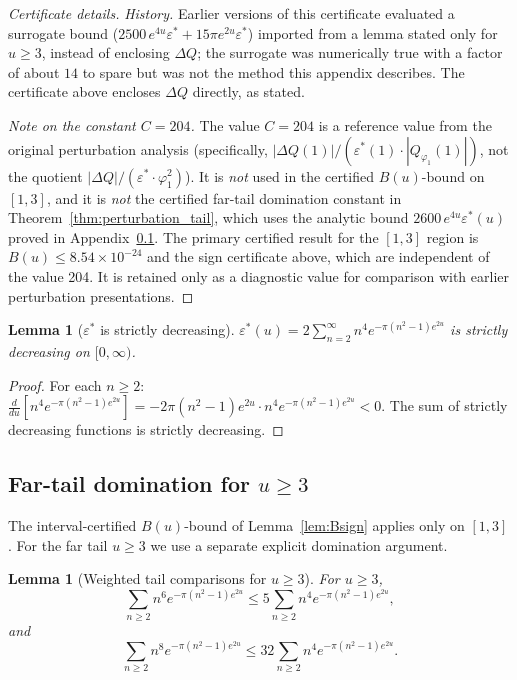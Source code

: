 \documentclass[11pt]{article}
\newtheorem{lemma}[theorem]{Lemma}
\theoremstyle{definition}
\theoremstyle{remark}
\begin{document}
\begin{proof}[Certificate details]
\noindent\emph{History.}
Earlier versions of this certificate evaluated a surrogate bound
($2500\,e^{4u}\varepsilon^* + 15\pi e^{2u}\varepsilon^*$) imported from a
lemma stated only for $u \geq 3$, instead of enclosing $\Delta Q$;
the surrogate was numerically true with a factor of about $14$ to spare
but was not the method this appendix describes.
The certificate above encloses $\Delta Q$ directly, as stated.

\noindent\emph{Note on the constant $C=204$.}
The value $C=204$ is a reference value from the original perturbation analysis
(specifically, $|\Delta Q(1)|/(\varepsilon^*(1)\cdot|Q_{\varphi_1}(1)|)$,
not the quotient $|\Delta Q|/(\varepsilon^*\cdot\varphi_1^2)$).
It is \emph{not} used in the certified $B(u)$-bound on $[1,3]$,
and it is \emph{not} the certified far-tail domination constant in
Theorem~\ref{thm:perturbation_tail}, which uses the analytic bound
$2600\,e^{4u}\varepsilon^*(u)$ proved in Appendix~\ref{sec:appE7}.
The primary certified result for the $[1,3]$ region is $B(u) \leq 8.54\times 10^{-24}$
and the sign certificate above, which are independent of the value 204.
It is retained only as a diagnostic value for comparison with earlier
perturbation presentations.
\end{proof}

\begin{lemma}[$\varepsilon^*$ is strictly decreasing]\label{lem:epsstar}
$\varepsilon^*(u) = 2\sum_{n=2}^{\infty}n^4 e^{-\pi(n^2-1)e^{2u}}$ is strictly
decreasing on $[0,\infty)$.
\end{lemma}

\begin{proof}
For each $n\geq 2$:
$\frac{d}{du}[n^4 e^{-\pi(n^2-1)e^{2u}}] = -2\pi(n^2-1)e^{2u}\cdot n^4 e^{-\pi(n^2-1)e^{2u}} < 0$.
The sum of strictly decreasing functions is strictly decreasing.
\end{proof}

\subsection{Far-tail domination for $u\geq 3$}
\label{sec:appE7}

The interval-certified $B(u)$-bound of Lemma~\ref{lem:Bsign} applies only on $[1,3]$.
For the far tail $u\geq 3$ we use a separate explicit domination argument.

\begin{lemma}[Weighted tail comparisons for $u\ge3$]\label{lem:weighted_comparisons}
For $u\ge3$,
\[
\sum_{n\ge2}n^6 e^{-\pi(n^2-1)e^{2u}}
\le
5\sum_{n\ge2}n^4 e^{-\pi(n^2-1)e^{2u}},
\]
and
\[
\sum_{n\ge2}n^8 e^{-\pi(n^2-1)e^{2u}}
\le
32\sum_{n\ge2}n^4 e^{-\pi(n^2-1)e^{2u}}.
\]
\end{lemma}
\end{document}
